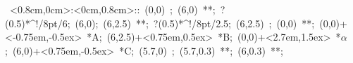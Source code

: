 
\hbox{
\xy    <0.8cm,0cm>:<0cm,0.8cm>::
       (0,0) ; (6,0) **\dir{-}; ?(0.5)*^!/8pt/{6};
       (6,0); (6,2.5) **\dir{-}; ?(0.5)*^!/8pt/{2.5}; 
       (6,2.5) ; (0,0) **\dir{-};  
       (0,0)+<-0.75em,-0.5ex> *{A};
       (6,2.5)+<0.75em,0.5ex> *{B};
       (0,0)+<2.7em,1.5ex> *\hbox{$\alpha$};
       (6,0)+<0.75em,-0.5ex> *{C};
	(5.7,0) ; (5.7,0.3) **\dir{-}; (6,0.3) **\dir{-};
       \endxy}
	   
